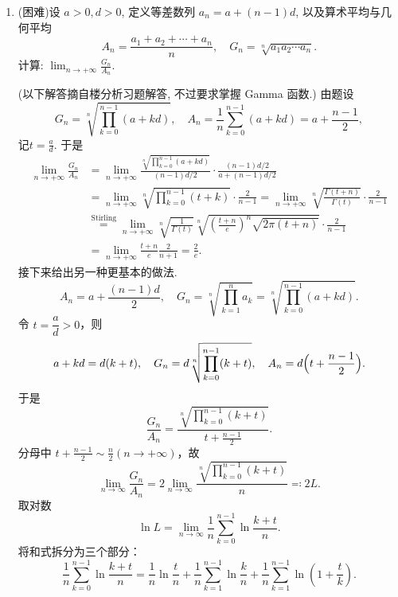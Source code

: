 \begin{enumerate}
    \item[14.](困难)设 $a > 0, d > 0$, 定义等差数列 $a_n = a + (n - 1)d$, 以及算术平均与几何平均
    \[A_{n} = \frac{a_{1} + a_{2} + \cdots + a_{n}}{n}, \quad G_{n} = \sqrt[n]{a_{1}a_{2}\cdots a_{n}}.\]
    计算: $\displaystyle\lim_{n \to +\infty} \frac{G_n}{A_n}$.
    \begin{solution}
        (以下解答摘自楼分析习题解答, 不过要求掌握 Gamma 函数.) 由题设
        \[G_n=\sqrt[n]{\prod_{k=0}^{n-1}\left(a+kd\right)},
        \quad A_n=\frac{1}{n}\displaystyle\sum_{k=0}^{n-1}\left(a+kd\right)=a+\frac{n-1}{2},\] 
        记\(\displaystyle t=\frac{a}{d}\). 于是
        \[\begin{aligned}
        \lim_{n\rightarrow+\infty}\frac{G_n}{A_n}
        &=\lim_{n\rightarrow+\infty}\frac{\sqrt[n]{\displaystyle\prod_{k=0}^{n-1}\left(a+kd\right)}}{(n-1)d/2}\cdot\frac{(n-1)d/2}{a+(n-1)d/2}\\
        &=\lim_{n\rightarrow+\infty}\sqrt[n]{\prod_{k=0}^{n-1}(t+k)}\cdot\frac{2}{n-1}
        =\lim_{n\rightarrow+\infty}\sqrt[n]{\frac{\Gamma(t+n)}{\Gamma(t)}}\cdot\frac{2}{n-1}\\
        &\overset{\mathrm{Stirling}}{=}\lim_{n\rightarrow+\infty}\sqrt[n]{\frac{1}{\Gamma(t)}}\sqrt[n]{\left(\frac{t+n}{e}\right)^n\sqrt{2\pi(t+n)}}\cdot\frac{2}{n-1}\\
        &=\lim_{n\rightarrow+\infty}\frac{t+n}{e}\frac{2}{n+1}=\frac{2}{e}.
        \end{aligned}\]
        接下来给出另一种更基本的做法. \\
        \[
        A_n = a + \frac{(n-1)d}{2},\quad G_n = \sqrt[n]{\prod_{k=1}^{n} a_k} = \sqrt[n]{\prod_{k=0}^{n-1} (a+kd)}.
        \]
        令 \(t = \dfrac{a}{d} > 0\)，则
        \[
        a+kd = d(k+t),\quad 
        G_n = d\sqrt[n]{\prod_{k=0}^{n-1}(k+t)},\quad 
        A_n = d\Bigl(t+\frac{n-1}{2}\Bigr).
        \]
        于是
        \[
        \frac{G_n}{A_n} = \frac{\displaystyle\sqrt[n]{\prod_{k=0}^{n-1}(k+t)}}{\displaystyle t+\frac{n-1}{2}}.
        \]
        分母中 \(\displaystyle t+\frac{n-1}{2} \sim \frac{n}{2}(n\to+\infty)\)，故
        \[
        \lim_{n\to\infty}\frac{G_n}{A_n}=2\lim_{n\to\infty}\frac{\displaystyle\sqrt[n]{\prod_{k=0}^{n-1}(k+t)}}{n}\eqqcolon 2L.
        \]
        取对数
        \[
        \ln L = \lim_{n\to\infty}\frac{1}{n}\sum_{k=0}^{n-1}\ln\frac{k+t}{n}.
        \]
        将和式拆分为三个部分：
        \[
        \frac{1}{n}\sum_{k=0}^{n-1}\ln\frac{k+t}{n}
        = \frac{1}{n}\ln\frac{t}{n} + \frac{1}{n}\sum_{k=1}^{n-1}\ln\frac{k}{n} + \frac{1}{n}\sum_{k=1}^{n-1}\ln\!\left(1+\frac{t}{k}\right).
\]
\end{solution}
\end{enumerate}
